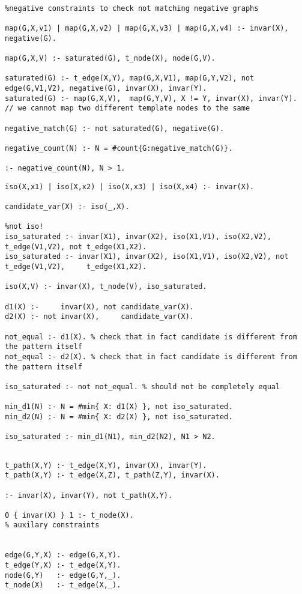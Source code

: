 \documentclass{article}
\theoremstyle{definition}
\begin{document}
\begin{lstlisting}[caption=ASP negative matching]
%Saturated Representation

%negative constraints to check not matching negative graphs

map(G,X,v1) | map(G,X,v2) | map(G,X,v3) | map(G,X,v4) :- invar(X), negative(G).

map(G,X,V) :- saturated(G), t_node(X), node(G,V).

saturated(G) :- t_edge(X,Y), map(G,X,V1), map(G,Y,V2), not edge(G,V1,V2), negative(G), invar(X), invar(Y).
saturated(G) :- map(G,X,V),  map(G,Y,V), X != Y, invar(X), invar(Y). // we cannot map two different template nodes to the same 

negative_match(G) :- not saturated(G), negative(G).

negative_count(N) :- N = #count{G:negative_match(G)}.

:- negative_count(N), N > 1.

\end{lstlisting}

\begin{lstlisting}[caption=Canonicity template-based check]
iso(X,x1) | iso(X,x2) | iso(X,x3) | iso(X,x4) :- invar(X).

candidate_var(X) :- iso(_,X).

%not iso!
iso_saturated :- invar(X1), invar(X2), iso(X1,V1), iso(X2,V2),     t_edge(V1,V2), not t_edge(X1,X2). 
iso_saturated :- invar(X1), invar(X2), iso(X1,V1), iso(X2,V2), not t_edge(V1,V2),     t_edge(X1,X2).
 
iso(X,V) :- invar(X), t_node(V), iso_saturated.

d1(X) :-     invar(X), not candidate_var(X). 
d2(X) :- not invar(X),     candidate_var(X).

not_equal :- d1(X). % check that in fact candidate is different from the pattern itself
not_equal :- d2(X). % check that in fact candidate is different from the pattern itself

iso_saturated :- not not_equal. % should not be completely equal

min_d1(N) :- N = #min{ X: d1(X) }, not iso_saturated.
min_d2(N) :- N = #min{ X: d2(X) }, not iso_saturated.

iso_saturated :- min_d1(N1), min_d2(N2), N1 > N2.
\end{lstlisting}

\begin{lstlisting}[caption=Auxilary predicates -- probably should be moved to appendix]
%selects subpattern

t_path(X,Y) :- t_edge(X,Y), invar(X), invar(Y).
t_path(X,Y) :- t_edge(X,Z), t_path(Z,Y), invar(X).

:- invar(X), invar(Y), not t_path(X,Y).

0 { invar(X) } 1 :- t_node(X).
% auxilary constraints


edge(G,Y,X) :- edge(G,X,Y).
t_edge(Y,X) :- t_edge(X,Y).
node(G,Y)   :- edge(G,Y,_).
t_node(X)   :- t_edge(X,_).
\end{lstlisting}
\end{document}
